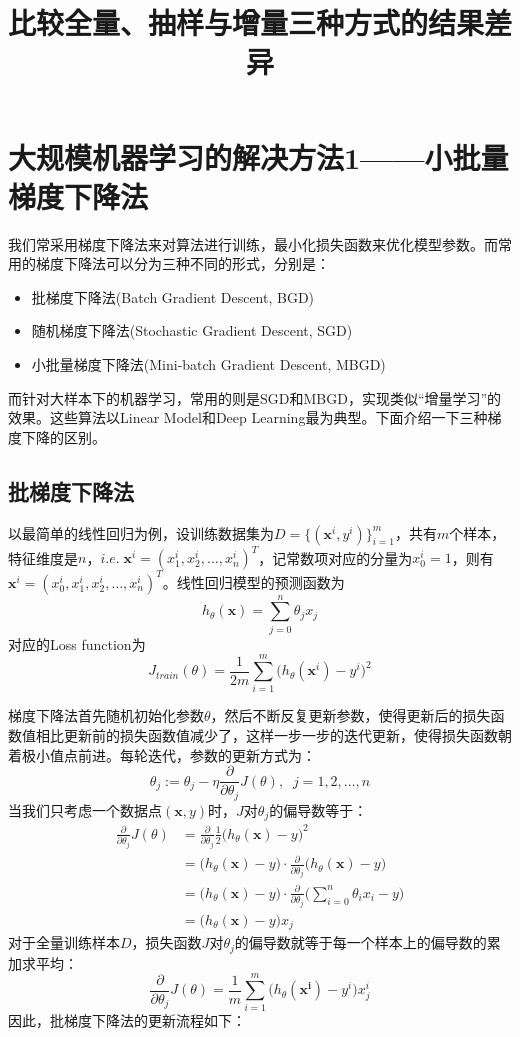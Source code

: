 \documentclass{article}
\title{比较全量、抽样与增量三种方式的结果差异}
\begin{document}
\maketitle
\tableofcontents
\section{大规模机器学习的解决方法1——小批量梯度下降法}
我们常采用梯度下降法来对算法进行训练，最小化损失函数来优化模型参数。而常用的梯度下降法可以分为三种不同的形式，分别是：
\begin{itemize}
	\item 批梯度下降法(Batch Gradient Descent, BGD)
	\item 随机梯度下降法(Stochastic Gradient Descent, SGD)
	\item 小批量梯度下降法(Mini-batch Gradient Descent, MBGD)
\end{itemize}

而针对大样本下的机器学习，常用的则是SGD和MBGD，实现类似“增量学习”的效果。这些算法以Linear Model和Deep Learning最为典型。下面介绍一下三种梯度下降的区别。

	\subsection{批梯度下降法}
	以最简单的线性回归为例，设训练数据集为$D=\{(\boldsymbol{x}^i,y^i)\}_{i=1}^m$，共有$m$个样本，特征维度是$n$，$i.e.\;\boldsymbol{x}^i = (x_1^i,x_2^i,\ldots,x_n^i)^T$，记常数项对应的分量为$x_0^i=1$，则有$\boldsymbol{x}^i = (x_0^i,x_1^i,x_2^i,\ldots,x_n^i)^T$。线性回归模型的预测函数为
	$$h_{\theta}(\boldsymbol{x}) = \sum_{j=0}^n\theta_jx_j$$
	对应的Loss function为
	$$J_{train}(\theta) = \frac{1}{2m}\sum_{i=1}^m\big(h_{\theta}(\boldsymbol{x}^i)-y^i\big)^2$$

	梯度下降法首先随机初始化参数$\theta$，然后不断反复更新参数，使得更新后的损失函数值相比更新前的损失函数值减少了，这样一步一步的迭代更新，使得损失函数朝着极小值点前进。每轮迭代，参数的更新方式为：
	$$\theta_j:=\theta_j - \eta\frac{\partial}{\partial\theta_j}J(\theta),\;\;j=1,2,\ldots,n$$
	当我们只考虑一个数据点$(\boldsymbol{x},y)$时，$J$对$\theta_j$的偏导数等于：
	\begin{align*}
	\frac{\partial}{\partial\theta_j}J(\theta) & =  \frac{\partial}{\partial\theta_j}\frac{1}{2}\big(h_\theta(\boldsymbol{x})-y\big)^2 \\
	& = \big(h_\theta(\boldsymbol{x})-y\big)\cdot\frac{\partial}{\partial\theta_j}\big(h_\theta(\boldsymbol{x})-y\big) \\
	& = \big(h_\theta(\boldsymbol{x})-y\big)\cdot\frac{\partial}{\partial\theta_j}\bigg(\sum_{i=0}^n\theta_ix_i-y\bigg) \\
	& = \big(h_\theta(\boldsymbol{x})-y\big)x_j
	\end{align*}
	对于全量训练样本$D$，损失函数$J$对$\theta_j$的偏导数就等于每一个样本上的偏导数的累加求平均：
	$$\frac{\partial}{\partial\theta_j}J(\theta) = \frac{1}{m}\sum_{i=1}^m\big(h_\theta(\boldsymbol{x^i})-y^i\big)x^i_j$$
	因此，批梯度下降法的更新流程如下：
\end{document}
